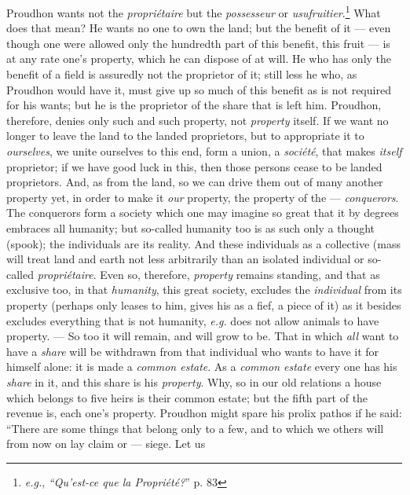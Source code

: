 Proudhon wants not the \textit{propri\'etaire} but the \textit{possesseur} or 
\textit{usufruitier}.\footnote{\textit{e.g.}, \textit{``Qu'est-ce que la 
Propri\'et\'e?}'' p. 83} What does that mean? He wants no one to own the 
land; but the benefit of it --- even though one were allowed only the hundredth 
part of this benefit, this fruit --- is at any rate one's property, which he 
can dispose of at will. He who has only the benefit of a field is assuredly 
not the proprietor of it; still less he who, as Proudhon would have it, must 
give up so much of this benefit as is not required for his wants; but he is 
the proprietor of the share that is left him. Proudhon, therefore, denies only 
such and such property, not \textit{property} itself. If we want no longer to 
leave the land to the landed proprietors, but to appropriate it to 
\textit{ourselves}, we unite ourselves to this end, form a union, a 
\textit{soci\'et\'e}, that makes \textit{itself} proprietor; if we have good 
luck in this, then those persons cease to be landed proprietors. And, as from 
the land, so we can drive them out of many another property yet, in order to 
make it \textit{our} property, the property of the --- \textit{conquerors}. The 
conquerors form a society which one may imagine so great that it by degrees 
embraces all humanity; but so-called humanity too is as such only a thought 
(spook); the individuals are its reality. And these individuals as a 
collective (mass will treat land and earth not less arbitrarily than an 
isolated individual or so-called \textit{propri\'etaire}. Even so, therefore, 
\textit{property} remains standing, and that as exclusive too, in that 
\textit{humanity}, this great society, excludes the \textit{individual} from 
its property (perhaps only leases to him, gives his as a fief, a piece of it) 
as it besides excludes everything that is not humanity, \textit{e.g.} does 
not allow animals to have property. --- So too it will remain, and will grow to 
be. That in which \textit{all} want to have a \textit{share} will be withdrawn 
from that individual who wants to have it for himself alone: it is made a 
\textit{common estate}. As a \textit{common estate} every one has his 
\textit{share} in it, and this share is his \textit{property}. Why, so in our 
old relations a house which belongs to five heirs is their common estate; but 
the fifth part of the revenue is, each one's property. Proudhon might spare 
his prolix pathos if he said: ``There are some things that belong only to a 
few, and to which we others will from now on lay claim or --- siege. Let us 
